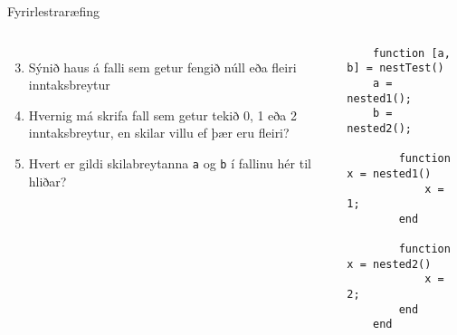 \documentclass[handout]{beamer}
\begin{document}
\begin{frame}[fragile]{Fyrirlestraræfing}
    \begin{columns}
    \begin{enumerate}
     \setcounter{enumi}{2}
     \item Sýnið haus á falli sem getur fengið núll eða fleiri inntaksbreytur
     \item Hvernig má skrifa fall sem getur tekið 0, 1 eða 2 inntaksbreytur, en skilar villu ef þær eru fleiri?
     \item Hvert er gildi skilabreytanna \texttt{a} og \texttt{b} í fallinu hér til hliðar?
    \end{enumerate}
    \begin{verbatim}
    function [a, b] = nestTest()
    a = nested1();
    b = nested2();
    
        function x = nested1()
            x = 1;
        end
    
        function x = nested2()
            x = 2;
        end
    end
    \end{verbatim}
    
    \end{columns}
\end{frame}
\end{document}
